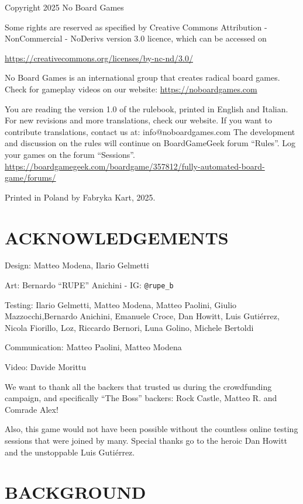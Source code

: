 Copyright 2025 No Board Games

Some rights are reserved as specified by Creative Commons Attribution - NonCommercial - NoDerivs version 3.0 licence, which can be accessed on

\url{https://creativecommons.org/licenses/by-nc-nd/3.0/}

\vfill

No Board Games is an international group that creates radical board games.
Check for gameplay videos on our website: \url{https://noboardgames.com}

\vfill

You are reading the version 1.0 of the rulebook, printed in English and Italian. For new
revisions and more translations, check our website. If you want to contribute translations,
contact us at: info@noboardgames.com
The development and discussion on the rules will continue on BoardGameGeek forum
“Rules”. Log your games on the forum “Sessions”. \url{https://boardgamegeek.com/boardgame/357812/fully-automated-board-game/forums/}

Printed in Poland by Fabryka Kart, 2025.

\section{ACKNOWLEDGEMENTS}

    Design: Matteo Modena, Ilario Gelmetti
    
    Art: Bernardo “RUPE” Anichini - IG: \texttt{@rupe\_b}
    
    Testing: Ilario Gelmetti, Matteo Modena, Matteo Paolini, Giulio Mazzocchi,Bernardo Anichini,
    Emanuele Croce, Dan Howitt, Luis Gutiérrez, Nicola Fiorillo, Loz, Riccardo Bernori,
    Luna Golino, Michele Bertoldi
    
    Communication: Matteo Paolini, Matteo Modena
    
    Video: Davide Morittu
    
    We want to thank all the backers that trusted us during the crowdfunding campaign, and
    specifically “The Boss” backers: Rock Castle, Matteo R. and Comrade Alex!
    
    Also, this game would not have been possible without the countless online testing
    sessions that were joined by many. Special thanks go to the heroic Dan Howitt and the
    unstoppable Luis Gutiérrez.


\section{BACKGROUND}

